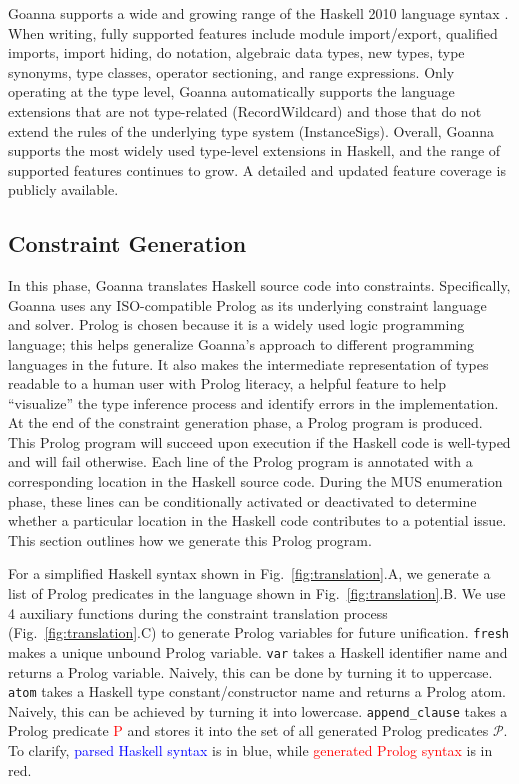 \documentclass[pdflatex,lineno,sn-nature,Numbered]{sn-jnl}%
\begin{document}
    Goanna supports a wide and growing range of the Haskell 2010 language syntax \cite{Simon_Marlow2010-lg}. When writing, fully supported features include module import/export, qualified imports, import hiding, do notation, algebraic data types, new types, type synonyms, type classes, operator sectioning, and range expressions. Only operating at the type level, Goanna automatically supports the language extensions that are not type-related (RecordWildcard) and those that do not extend the rules of the underlying type system (InstanceSigs). Overall, Goanna supports the most widely used type-level extensions in Haskell, and the range of supported features continues to grow.  A detailed and updated feature coverage \cite{Fu2023-rp} is publicly available.

    \subsection{Constraint Generation} \label{sub:translation}
In this phase, Goanna translates Haskell source code into constraints. Specifically, Goanna uses any ISO-compatible Prolog \cite{Wielemaker2011-sr} as its underlying constraint language and solver. Prolog is chosen because it is a widely used logic programming language; this helps generalize Goanna's approach to different programming languages in the future. It also makes the intermediate representation of types readable to a human user with Prolog literacy, a helpful feature to help ``visualize'' the type inference process and identify errors in the implementation. At the end of the constraint generation phase, a Prolog program is produced. This Prolog program will succeed upon execution if the Haskell code is well-typed and will fail otherwise. Each line of the Prolog program is annotated with a corresponding location in the Haskell source code. During the MUS enumeration phase, these lines can be conditionally activated or deactivated to determine whether a particular location in the Haskell code contributes to a potential issue. This section outlines how we generate this Prolog program. 

For a simplified Haskell syntax shown in Fig.~\ref{fig:translation}.A, we generate a list of Prolog predicates in the language shown in Fig.~\ref{fig:translation}.B. We use 4 auxiliary functions during the constraint translation process (Fig.~\ref{fig:translation}.C) to generate Prolog variables for future unification. \texttt{fresh} makes a unique unbound Prolog variable. \texttt{var} takes a Haskell identifier name and returns a Prolog variable. Naively, this can be done by turning it to uppercase. \texttt{atom} takes a Haskell type constant/constructor name and returns a Prolog atom. Naively, this can be achieved by turning it into lowercase. \texttt{append\_clause} takes a Prolog predicate \textcolor{red}{P} and stores it into the set of all generated Prolog predicates $\mathcal{P}$. To clarify,  \textcolor{blue}{parsed Haskell syntax} is in blue, while \textcolor{red}{generated Prolog syntax} is in red. 
    
\end{document}
